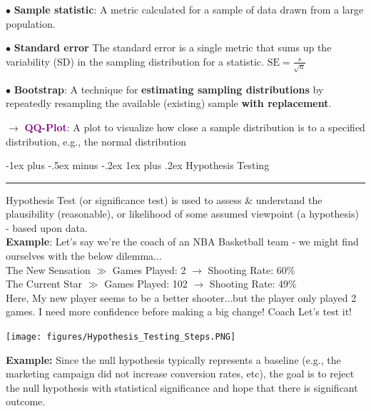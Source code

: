 \documentclass[letterpaper, 10.5pt,landscape]{article}
\makeatletter
\renewcommand{\subsubsection}{\@startsection{subsubsection}{3}{0mm}%
                                {-1ex plus -.5ex minus -.2ex}%
                                {1ex plus .2ex}%
                                {\normalfont\small\bfseries}}
\makeatother
\begin{document}
\begin{multicols*}{3}
$\bullet$ \textbf{Sample statistic}: 
A metric calculated for a sample of data drawn from a large population.

$\bullet$ \textbf{Standard error} The standard error is a single metric that sums up the variability (SD) in the sampling distribution for a statistic. \( \text{SE} = \frac{s}{\sqrt{n}}\)




$\bullet$ \textbf{Bootstrap}: A technique for \textbf{estimating sampling distributions} by repeatedly resampling the available (existing) sample \textbf{with replacement}.


$\rightarrow$ \textcolor{purple}{\textbf{QQ-Plot}}: A plot to visualize how close a sample distribution is to a specified distribution, e.g., the normal distribution







\subsubsection{Hypothesis Testing} {\color{teal}\hrule height 0.5pt} \smallskip

Hypothesis Test (or significance test) is used to assess \& understand the plausibility (reasonable), or likelihood of some assumed viewpoint (a hypothesis) - based upon data. \\

\textbf{Example}: Let's say we're the coach of an NBA Basketball team - we might find ourselves with the below dilemma...\\
The New Sensation $\gg$ Games Played: 2 $\rightarrow$ Shooting Rate: 60\% \\
The Current Star $\gg$ Games Played: 102 $\rightarrow$ Shooting Rate: 49\% \\
Here, My new player seems to be a better shooter...but the player only played 2 games. I need more confidence
before making a big change! Coach Let's test it! \\


\begin{center}
    \begin{minipage}{0.9\linewidth}
    \texttt{[image: figures/Hypothesis\_Testing\_Steps.PNG]}
    \end{minipage}
\end{center}





\textbf{Example:} Since the null hypothesis typically represents a baseline (e.g., the marketing campaign did not increase conversion rates, etc), the goal is to reject the null hypothesis with statistical significance and hope that there is significant outcome.



\end{multicols*}
\end{document}
